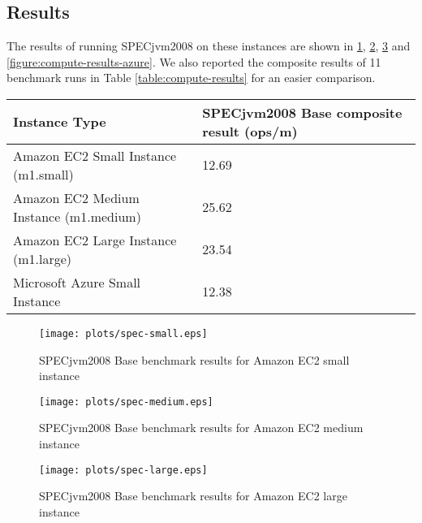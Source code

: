 \subsection{Results}
\label{subsection:compute-results}
The results of running SPECjvm2008 on these instances are shown in \ref{figure:compute-results-small}, \ref{figure:compute-results-medium}, \ref{figure:compute-results-large} and \ref{figure:compute-results-azure}. We also reported the composite results of 11 benchmark runs in Table \ref{table:compute-results} for an easier comparison. 


\begin{table*}
\center
  \begin{tabular} {| l | l |}
\hline
Instance Type & SPECjvm2008 Base composite result (ops/m) \\
\hline
Amazon EC2 Small Instance (m1.small) & 12.69 \\
Amazon EC2 Medium Instance (m1.medium) & 25.62 \\ 
Amazon EC2 Large Instance (m1.large) & 23.54 \\
Microsoft Azure Small Instance & 12.38  \\
\hline
\end{tabular}
\caption{SPECjvm2008 base benchmark results (composite score of 11 benchmarks)}
\label{table:compute-results}
\end{table*}


\begin{figure}
\begin{center}
\texttt{[image: plots/spec-small.eps]}
\end{center}
\caption{SPECjvm2008 Base benchmark results for Amazon EC2 small instance}
\label{figure:compute-results-small}
\end{figure}

\begin{figure}
\begin{center}
\texttt{[image: plots/spec-medium.eps]}
\end{center}
\caption{SPECjvm2008 Base benchmark results for Amazon EC2 medium instance}
\label{figure:compute-results-medium}
\end{figure}

\begin{figure}
\begin{center}
\texttt{[image: plots/spec-large.eps]}
\end{center}
\caption{SPECjvm2008 Base benchmark results for Amazon EC2 large instance}
\label{figure:compute-results-large}
\end{figure}

